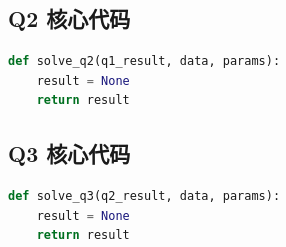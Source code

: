 \documentclass[UTF8,a4paper,12pt]{ctexart}
\numberwithin{equation}{section}
\newif\ifqfour
\begin{document}
\subsection{Q2 核心代码}
\begin{lstlisting}[language=Python,caption={问题二核心代码示例}]
def solve_q2(q1_result, data, params):
    result = None
    return result
\end{lstlisting}
\subsection{Q3 核心代码}
\begin{lstlisting}[language=Python,caption={问题三核心代码示例}]
def solve_q3(q2_result, data, params):
    result = None
    return result
\end{lstlisting}
\ifqfour
\subsection{Q4 核心代码}
\begin{lstlisting}[language=Python,caption={问题四核心代码示例}]
def solve_q4(previous_results, data, params):
    result = None
    return result
\end{lstlisting}
\fi
\end{document}
